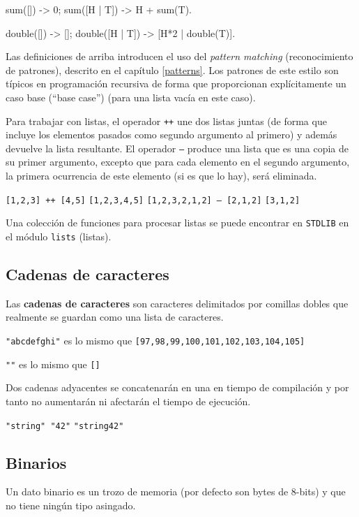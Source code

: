 \begin{erlang}
sum([]) -> 0;
sum([H | T]) -> H + sum(T).

double([]) -> [];
double([H | T]) -> [H*2 | double(T)].
\end{erlang}

Las definiciones de arriba introducen el uso del \textit{pattern matching} (reconocimiento de patrones), descrito en el capítulo \ref{patterns}. Los patrones de este estilo son típicos en programación recursiva de forma que proporcionan explícitamente un caso base (``base case'') (para una lista vacía en este caso). 

Para trabajar con listas, el operador \texttt{++} une dos listas juntas (de forma que incluye los elementos pasados como segundo argumento al primero) y además devuelve la lista resultante. El operador \texttt{--} produce una lista que es una copia de su primer argumento, excepto que para cada elemento en el segundo argumento, la primera ocurrencia de este elemento (si es que lo hay), será eliminada. 

\texttt{[1,2,3] ++ [4,5]} \resultingin \texttt{[1,2,3,4,5]}
\texttt{[1,2,3,2,1,2] -- [2,1,2]} \resultingin \texttt{[3,1,2]}

Una colección de funciones para procesar listas se puede encontrar en \texttt{STDLIB} en el módulo \texttt{lists} (listas). 


\subsection{Cadenas de caracteres}
\label{datatypes:string}
Las \textbf{cadenas de caracteres} son caracteres delimitados por comillas dobles que realmente se guardan como una lista de caracteres. 

\texttt{"abcdefghi"} es lo mismo que \texttt{[97,98,99,100,101,102,103,104,105]}

\texttt{""} es lo mismo que \texttt{[]}

Dos cadenas adyacentes se concatenarán en una en tiempo de compilación y por tanto no aumentarán ni afectarán el tiempo de ejecución. 

\texttt{"string" "42"} \resultingin \texttt{"string42"}

\subsection{Binarios}
\label{datatypes:binary}
Un dato binario es un trozo de memoria (por defecto son bytes de 8-bits) y que no tiene ningún tipo asingado. 

